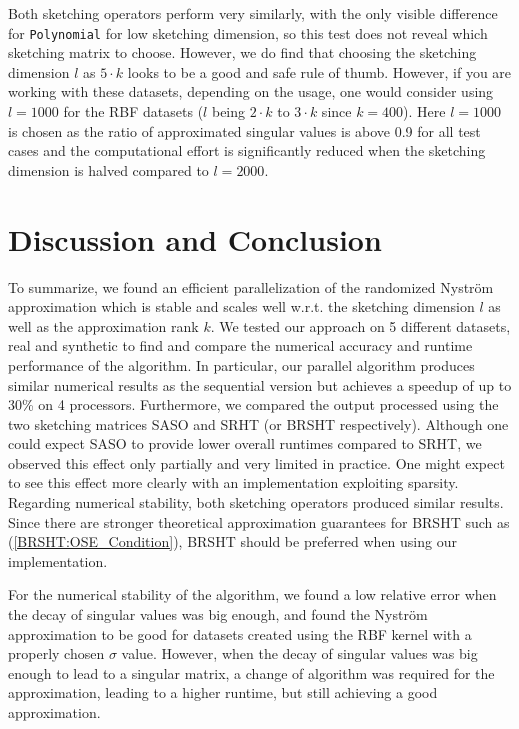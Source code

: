 \documentclass{article}
\theoremstyle{definition}
\begin{document}
Both sketching operators perform very similarly, with the only visible
difference for \texttt{Polynomial} for low sketching dimension, so this test
does not reveal which sketching matrix to choose. However, we do find that
choosing the sketching dimension $l$ as $5\cdot k$ looks to be a good and safe
rule of thumb. However, if you are working with these datasets, depending on the
usage, one would consider using $l=1000$ for the RBF datasets ($l$ being $2\cdot
k$ to $3\cdot k$ since $k=400$). Here $l=1000$ is chosen as the ratio of
approximated singular values is above 0.9 for all test cases and the
computational effort is significantly reduced when the sketching dimension is
halved compared to $l=2000$.


\section{Discussion and Conclusion}
To summarize, we found an efficient parallelization of the randomized Nyström
approximation which is stable and scales well w.r.t. the sketching dimension $l$
as well as the approximation rank $k$. We tested our approach on 5 different
datasets, real and synthetic to find and compare the numerical accuracy and
runtime performance of the algorithm. In particular, our parallel algorithm
produces similar numerical results as the sequential version but achieves a
speedup of up to 30\% on 4 processors. Furthermore, we compared the output
processed using the two sketching matrices SASO and SRHT (or BRSHT
respectively). Although one could expect SASO to provide lower overall runtimes
compared to SRHT, we observed this effect only partially and very limited in
practice. One might expect to see this effect more clearly with an
implementation exploiting sparsity. Regarding numerical stability, both
sketching operators produced similar results. Since there are stronger
theoretical approximation guarantees for BRSHT such as
(\ref{BRSHT:OSE_Condition}), BRSHT should be preferred when using our
implementation.\newline

For the numerical stability of the algorithm, we found a low relative error when
the decay of singular values was big enough, and found the Nyström approximation
to be good for datasets created using the RBF kernel with a properly chosen
$\sigma$ value. However, when the decay of singular values was big enough to
lead to a singular matrix, a change of algorithm was required for the
approximation, leading to a higher runtime, but still achieving a good
approximation.\newline
\end{document}
